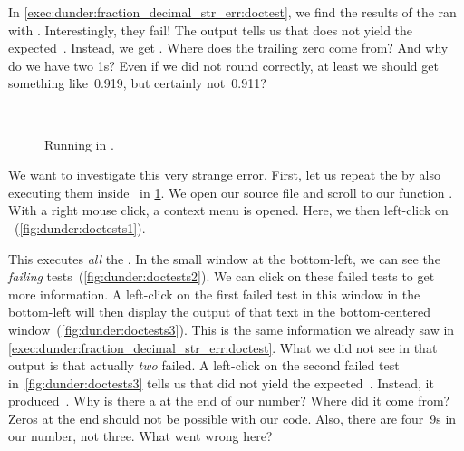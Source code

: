 In \cref{exec:dunder:fraction_decimal_str_err:doctest}, we find the results of the  ran with \pytest.
Interestingly, they fail!
The output tells us that  does not yield the expected~.
Instead, we get .
Where does the trailing zero come from?
And why do we have two 1s?
Even if we did not round correctly, at least we should get something like~0.919, but certainly not~0.911?

\begin{figure}%
\centering%
%
%
%
\strut\hfill\strut%
%
%
%
\\[10pt]%
%
%
%
\strut\hfill\strut%
%
%
\caption{Running  in \pycharm.}%
\label{fig:dunder:doctests}%
\end{figure}%

We want to investigate this very strange error.
First, let us repeat the  by also executing them inside \pycharm\ in \cref{fig:dunder:doctests}.
We open our source file and scroll to our function .
With a right mouse click, a context menu is opened.
Here, we then left-click on ~(\cref{fig:dunder:doctests1}).

This executes \emph{all} the .
In the small window at the bottom-left, we can see the \emph{failing} tests~(\cref{fig:dunder:doctests2}).
We can click on these failed tests to get more information.
A left-click on the first failed test in this window in the bottom-left will then display the output of that text in the bottom-centered window~(\cref{fig:dunder:doctests3}).
This is the same information we already saw in \cref{exec:dunder:fraction_decimal_str_err:doctest}.
What we did not see in that output is that actually \emph{two}  failed.
A left-click on the second failed test in~\cref{fig:dunder:doctests3} tells us that  did not yield the expected~.
Instead, it produced~.
Why is there a  at the end of our number?
Where did it come from?
Zeros at the end should not be possible with our code.
Also, there are four~9s in our number, not three.
What went wrong here?

